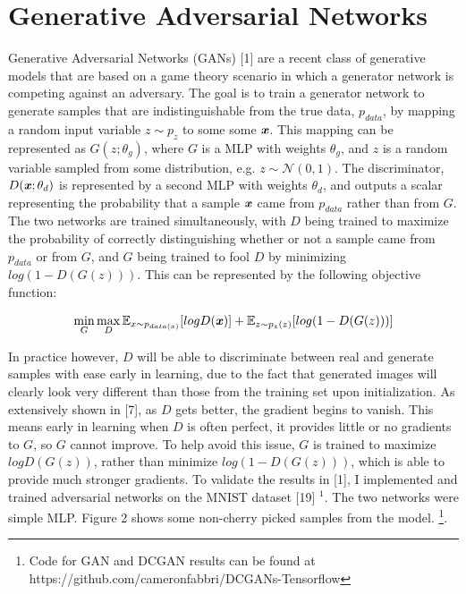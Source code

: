 \documentclass[9pt]{article}
\begin{document}
\section{Generative Adversarial Networks}
\noindent Generative Adversarial Networks (GANs) [1] are a recent class of generative models that are based on a game theory scenario in which a generator
network is competing against an adversary. The goal is to train a generator network to generate samples that are indistinguishable from the true data, $p_{data}$,
by mapping a random input variable $z \sim p_z$ to some some $\textbf{\textit{x}}$. This mapping can be represented as $G(z;\theta_g)$, where $G$ is a MLP with weights $\theta_g$, and $z$ is a random
variable sampled from some distribution, e.g. $z \sim \mathcal{N}(0,1)$. The discriminator, $D(\textbf{\textit{x}}; \theta_d)$ is represented by a second MLP with weights
$\theta_d$, and outputs a scalar representing the probability that a sample $\textbf{\textit{x}}$ came from $p_{data}$ rather than from $G$. The two networks are trained
simultaneously, with $D$ being trained to maximize the probability of correctly distinguishing whether or not a sample came from $p_{data}$ or from $G$, and $G$ being 
trained to fool $D$ by minimizing $log(1-D(G(z)))$. This can be represented by the following objective function:

\[\min\limits_{G}\max\limits_{D} \mathbb{E}_{x \sim p_{data(x)}} [logD(\textbf{\textit{x}})] + \mathbb{E}_{z \sim p_z(z)}[log(1 - D(G(z)))]\]

\noindent In practice however, $D$ will be able to discriminate between real and generate samples with
ease early in learning, due to the fact that generated images will clearly look very different than those from the training set upon initialization. As extensively shown in [7],
as $D$ gets better, the gradient begins to vanish. This means early in learning when $D$ is often perfect, it provides little or no gradients to $G$, so $G$ cannot improve.
To help avoid this issue, $G$ is trained to maximize $logD(G(z))$, rather than minimize $log(1-D(G(z)))$, which is able to provide much stronger gradients. To validate the
results in [1], I implemented and trained adversarial networks on the MNIST dataset [19] $^1$. The two networks were simple MLP. Figure 2 shows some non-cherry
picked samples from the model. \footnote{Code for GAN and DCGAN results can be found at https://github.com/cameronfabbri/DCGANs-Tensorflow}. \newline
\end{document}
